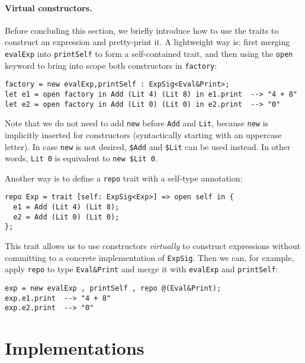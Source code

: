 \paragraph{Virtual constructors.}
Before concluding this section, we briefly introduce how to use the traits to
construct an expression and pretty-print it. A lightweight way is: first merging
\lstinline{evalExp} into \lstinline{printSelf} to form a self-contained trait,
and then using the \lstinline{open} keyword to bring into scope both
constructors in \lstinline{factory}:
\begin{lstlisting}
factory = new evalExp,printSelf : ExpSig<Eval&Print>;
let e1 = open factory in Add (Lit 4) (Lit 8) in e1.print  --> "4 + 8"
let e2 = open factory in Add (Lit 0) (Lit 0) in e2.print  --> "0"
\end{lstlisting}
Note that we do not need to add \lstinline{new} before \lstinline{Add} and
\lstinline{Lit}, because \lstinline{new} is implicitly inserted for constructors
(syntactically starting with an uppercase letter). In case \lstinline{new} is
not desired, \lstinline{$Add} and \lstinline{$Lit} can be used instead. In other
words, \lstinline{Lit 0} is equivalent to \lstinline{new $Lit 0}.

Another way is to define a \lstinline{repo} trait with a self-type annotation:
\begin{lstlisting}
repo Exp = trait [self: ExpSig<Exp>] => open self in {
  e1 = Add (Lit 4) (Lit 8);
  e2 = Add (Lit 0) (Lit 0);
};
\end{lstlisting}
This trait allows us to use constructors \emph{virtually} to construct
expressions without committing to a concrete implementation of \lstinline{ExpSig}.
Then we can, for example, apply \lstinline{repo} to type \lstinline{Eval&Print}
and merge it with \lstinline{evalExp} and \lstinline{printSelf}:
\begin{lstlisting}
exp = new evalExp , printSelf , repo @(Eval&Print);
exp.e1.print  --> "4 + 8"
exp.e2.print  --> "0"
\end{lstlisting}

\section{Implementations}

